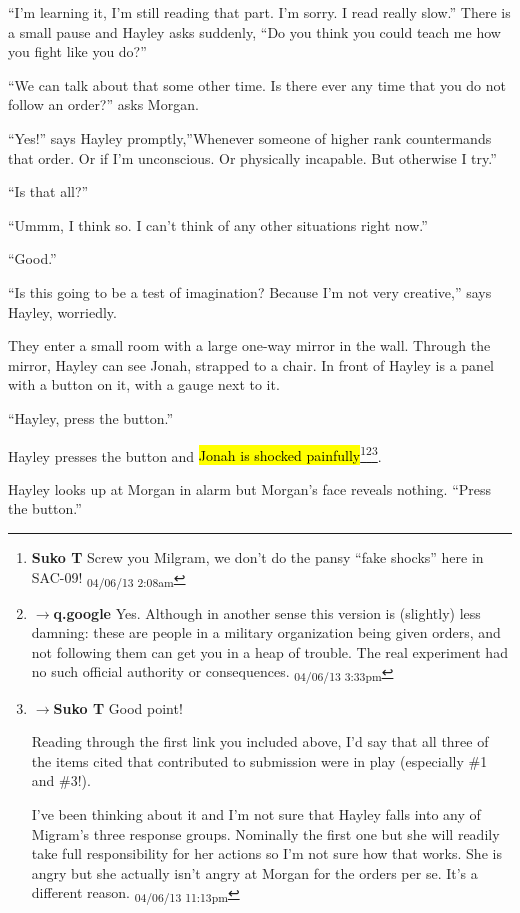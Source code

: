 ``I'm learning it, I'm still reading that part.  I'm sorry.  I read really slow.''  There is a small pause and Hayley asks suddenly, ``Do you think you could teach me how you fight like you do?''

``We can talk about that some other time.  Is there ever any time that you do not follow an order?'' asks Morgan.

``Yes!'' says Hayley promptly,''Whenever someone of higher rank countermands that order.  Or if I'm unconscious.  Or physically incapable.  But otherwise I try.''

``Is that all?''

``Ummm, I think so.    I can't think of any other situations right now.''

``Good.''

``Is this going to be a test of imagination?  Because I'm not very creative,'' says Hayley, worriedly. 



They enter a small room with a large one-way mirror in the wall.  Through the mirror, Hayley can see Jonah, strapped to a chair.  In front of Hayley is a panel with a button on it, with a gauge next to it.



``Hayley, press the button.''

Hayley presses the button and \hl{Jonah is shocked painfully}\footnote{\textbf{Suko T }Screw you Milgram, we don't do the pansy ``fake shocks'' here in SAC-09! \textsubscript{04/06/13 2:08am}}\footnote{$\rightarrow$\textbf{q.google }Yes.  Although in another sense this version is (slightly) less damning: these are people in a military organization being given orders, and not following them can get you in a heap of trouble.  The real experiment had no such official authority or consequences. \textsubscript{04/06/13 3:33pm}}\footnote{$\rightarrow$\textbf{Suko T }Good point! 

Reading through the first link you included above, I'd say that all three of the items cited that contributed to submission were in play (especially \#1 and \#3!). 

I've been thinking about it and I'm not sure that Hayley falls into any of Migram's three response groups.  Nominally the first one but she will readily take full responsibility for her actions so I'm not sure how that works.  She is angry but she actually isn't angry at Morgan for the orders per se.  It's a different reason. \textsubscript{04/06/13 11:13pm}}.

Hayley looks up at Morgan in alarm but Morgan's face reveals nothing.  ``Press the button.''

